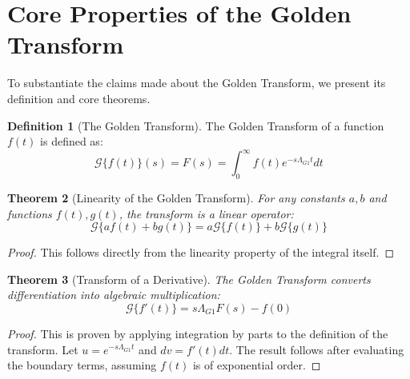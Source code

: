 \documentclass{article}
\theoremstyle{plain}
\newtheorem{theorem}{Theorem}[section]
\theoremstyle{definition}
\newtheorem{definition}[theorem]{Definition}
\theoremstyle{remark}
\begin{document}
\section{Core Properties of the Golden Transform}
To substantiate the claims made about the Golden Transform, we present its definition and core theorems.

\begin{definition}[The Golden Transform]
The Golden Transform of a function $f(t)$ is defined as:
$$ \mathcal{G}\{f(t)\}(s) = F(s) = \int_0^\infty f(t) e^{-s\Lambda_{G1} t} dt $$
\end{definition}

\begin{theorem}[Linearity of the Golden Transform]
For any constants $a, b$ and functions $f(t), g(t)$, the transform is a linear operator:
$$ \mathcal{G}\{a f(t) + b g(t)\} = a \mathcal{G}\{f(t)\} + b \mathcal{G}\{g(t)\} $$
\end{theorem}
\begin{proof}
This follows directly from the linearity property of the integral itself.
\end{proof}

\begin{theorem}[Transform of a Derivative]
The Golden Transform converts differentiation into algebraic multiplication:
$$ \mathcal{G}\{f'(t)\} = s\Lambda_{G1} F(s) - f(0) $$
\end{theorem}
\begin{proof}
This is proven by applying integration by parts to the definition of the transform. Let $u = e^{-s\Lambda_{G1}t}$ and $dv = f'(t)dt$. The result follows after evaluating the boundary terms, assuming $f(t)$ is of exponential order.
\end{proof}
\end{document}
